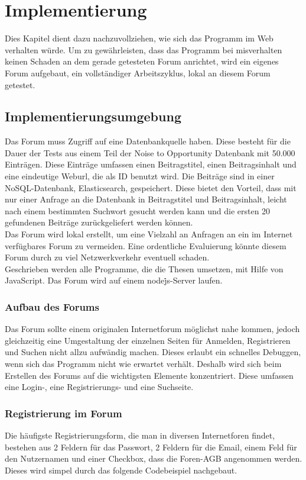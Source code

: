 \section{Implementierung}
Dies Kapitel dient dazu nachzuvollziehen, wie sich das Programm im Web verhalten würde. Um zu gewährleisten, dass das Programm bei misverhalten keinen Schaden an dem gerade getesteten Forum anrichtet, wird ein eigenes Forum aufgebaut, ein vollständiger Arbeitszyklus, lokal an diesem Forum getestet.

\subsection{Implementierungsumgebung}
Das Forum muss Zugriff auf eine Datenbankquelle haben. Diese besteht für die Dauer der Tests aus einem Teil der Noise to Opportunity Datenbank mit 50.000 Einträgen. Diese Einträge umfassen einen Beitragstitel, einen Beitragsinhalt und eine eindeutige Weburl, die als ID benutzt wird. Die Beiträge sind in einer NoSQL-Datenbank, Elasticsearch, gespeichert. Diese bietet den Vorteil, dass mit nur einer Anfrage an die Datenbank in Beitragstitel und Beitragsinhalt, leicht nach einem bestimmten Suchwort gesucht werden kann und die ersten 20 gefundenen Beiträge zurückgeliefert werden können.\\
Das Forum wird lokal erstellt, um eine Vielzahl an Anfragen an ein im Internet verfügbares Forum zu vermeiden. Eine ordentliche Evaluierung könnte diesem Forum durch zu viel Netzwerkverkehr eventuell schaden.\\
Geschrieben werden alle Programme, die die Thesen umsetzen, mit Hilfe von JavaScript. Das Forum wird auf einem node\.js-Server laufen. 

\subsubsection{Aufbau des Forums}
Das Forum sollte einem originalen Internetforum möglichst nahe kommen, jedoch gleichzeitig eine Umgestaltung der einzelnen Seiten für Anmelden, Registrieren und Suchen nicht allzu aufwändig machen. Dieses erlaubt ein schnelles Debuggen, wenn sich das Programm nicht wie erwartet verhält. Deshalb wird sich beim Erstellen des Forums auf die wichtigsten Elemente konzentriert. Diese umfassen eine Login-, eine Registrierungs- und eine Suchseite.

\subsubsection{Registrierung im Forum}
Die häufigste Registrierungsform, die man in diversen Internetforen findet, bestehen aus 2 Feldern für das Passwort, 2 Feldern für die Email, einem Feld für den Nutzernamen und einer Checkbox, dass die Foren-AGB angenommen werden. Dieses wird simpel durch das folgende Codebeispiel nachgebaut.

